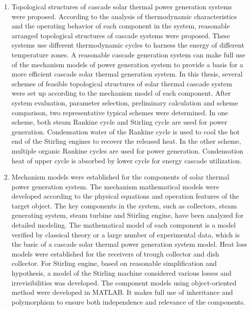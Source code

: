 \begin{enumerate}[label=(\arabic*)]
  \item Topological structures of cascade solar thermal power generation systems were proposed. According to the analysis of thermodynamic characteristics and the operating behavior of each component in the system, reasonable arranged topological structures of cascade systems were proposed. These systems use different thermodynamic cycles to harness the energy of different temperature zones. A reasonable cascade generation system can make full use of the mechanism models of power generation system to provide a basis for a more efficient cascade solar thermal generation system. In this thesis, several schemes of feasible topological structures of solar thermal cascade system were set up according to the mechanism model of each component. After system evaluation, parameter selection, preliminary calculation and scheme comparison, two representative typical schemes were determined. In one scheme, both steam Rankine cycle and Stirling cycle are used for power generation. Condensation water of the Rankine cycle is used to cool the hot end of the Stirling engines to recover the released heat. In the other scheme, multiple organic Rankine cycles are used for power generation. Condensation heat of upper cycle is absorbed by lower cycle for energy cascade utilization.
  \item Mechanism models were established for the components of solar thermal power generation system. The mechanism mathematical models were developed according to the physical equations and operation features of the target object. The key components in the system, such as collectors, steam generating system, steam turbine and Stirling engine, have been analyzed for detailed modeling. The mathematical model of each component is a model verified by classical theory or a large number of experimental data, which is the basic of a cascade solar thermal power generation system model. Heat loss models were established for the receivers of trough collector and dish collector. For Stirling engine, based on reasonable simplification and hypothesis, a model of the Stirling machine considered various losses and irrevisibilities was developed. The component models using object-oriented method were developed in MATLAB. It makes full use of inheritance and polymorphism to ensure both independence and relevance of the components.

\end{enumerate}
